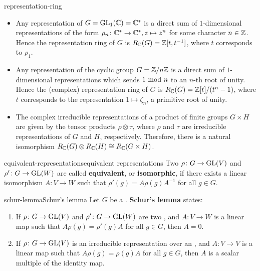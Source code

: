 \begin{example}{representation-ring}
    \begin{itemize}
        \item Any representation of $G = \textup{GL}_1(\mathbb{C}) = \mathbb{C}^*$ is a direct sum of $1$-dimensional representations of the form $\rho_n \colon \mathbb{C}^* \to \mathbb{C}^*, z \mapsto z^n$ for some character $n \in \mathbb{Z}$. Hence the representation ring of $G$ is $R_{\mathbb{C}}(G) = \mathbb{Z}[t, t^{-1}]$, where $t$ corresponds to $\rho_1$.
        
        \item Any representation of the cyclic group $G = \mathbb{Z}/n\mathbb{Z}$ is a direct sum of $1$-dimensional representations which sends $1 \textup{ mod } n$ to an $n$-th root of unity. Hence the (complex) representation ring of $G$ is $R_{\mathbb{C}}(G) = \mathbb{Z}[t]/(t^n - 1)$, where $t$ corresponds to the representation $1 \mapsto \zeta_n$, a primitive root of unity.
        
        \item The complex irreducible representations of a product of finite groups $G \times H$ are given by the tensor products $\rho \otimes \tau$, where $\rho$ and $\tau$ are irreducible representations of $G$ and $H$, respectively. Therefore, there is a natural isomorphism $R_{\mathbb{C}}(G) \otimes R_{\mathbb{C}}(H) \cong R_{\mathbb{C}}(G \times H)$.
    \end{itemize}
\end{example}

\begin{topic}{equivalent-representations}{equivalent representations}
    Two  $\rho \colon G \to \textup{GL}(V)$ and $\rho' \colon G \to \textup{GL}(W)$ are called \textbf{equivalent}, or \textbf{isomorphic}, if there exists a linear isomorphism $A \colon V \to W$ such that $\rho'(g) = A \rho(g) A^{-1}$ for all $g \in G$.
\end{topic}

\begin{topic}{schur-lemma}{Schur's lemma}
    Let $G$ be a . \textbf{Schur's lemma} states:
    \begin{enumerate}[label=(\roman*)]
        \item If $\rho \colon G \to \textup{GL}(V)$ and $\rho' \colon G \to \textup{GL}(W)$ are two   , and $A \colon V \to W$ is a linear map such that $A \rho(g) = \rho'(g) A$ for all $g \in G$, then $A = 0$.
        \item If $\rho \colon G \to \textup{GL}(V)$ is an irreducible representation over an , and $A \colon V \to V$ is a linear map such that $A \rho(g) = \rho(g) A$ for all $g \in G$, then $A$ is a scalar multiple of the identity map.
    \end{enumerate}
\end{topic}


